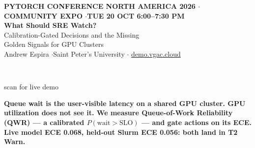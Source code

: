 \documentclass[12pt]{article}
\begin{document}
\pagecolor{white}
\color{ink}
\raggedright


\vspace*{-0.05in}
\begin{minipage}[t]{0.76\textwidth}
  {\fontsize{18}{22}\selectfont\color{sand}\bfseries
    PYTORCH CONFERENCE NORTH AMERICA 2026 \quad$\cdot$\quad
    COMMUNITY EXPO \quad$\cdot$\quad TUE 20 OCT 6:00--7:30 PM}\\[0.26in]
  {\fontsize{72}{78}\selectfont\bfseries\color{white}What Should SRE Watch?}\\[0.14in]
  {\fontsize{32}{38}\selectfont\color{sand}Calibration-Gated Decisions and the Missing\\Golden Signals for GPU Clusters}\\[0.30in]
  {\fontsize{26}{32}\selectfont\color{white}
    Andrew Espira \quad$\cdot$\quad Saint Peter's University \quad$\cdot$\quad
    \href{https://demo.vgac.cloud/}{\color{white}demo.vgac.cloud}}
\end{minipage}%
\hfill
\begin{minipage}[t]{2.6in}
  \vspace{0.20in}
  \\[-0.02in]
  {\centering\fontsize{16}{20}\selectfont\color{sand}scan for live demo\par}
\end{minipage}

\vspace{0.48in}

\noindent
\colorbox{pytorch}{%
  \parbox{\dimexpr\textwidth-2\fboxsep-2\fboxrule}{%
    \vspace{0.14in}
    {\fontsize{28}{36}\selectfont\bfseries\color{white}
    Queue wait is the user-visible latency on a shared GPU cluster.
    GPU utilization does not see it.
    We measure Queue-of-Work Reliability (QWR) --- a calibrated
    $P(\mathrm{wait}>\mathrm{SLO})$ --- and gate actions on its ECE.
    Live model ECE 0.068, held-out Slurm ECE 0.056: both land in T2 Warn.}
    \vspace{0.14in}
  }%
}
\end{document}
